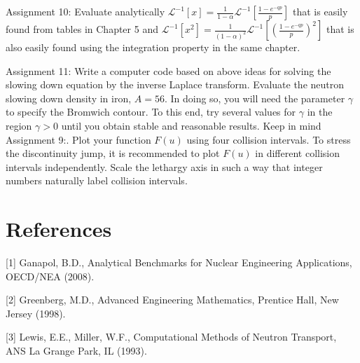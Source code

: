 \documentclass[10pt]{article}
\begin{document}
Assignment 10: Evaluate analytically $\mathcal{L}^{-1}[x]=\frac{1}{1-\alpha} \mathcal{L}^{-1}\left[\frac{1-e^{-q p}}{p}\right]$ that is easily found from tables in Chapter 5 and $\mathcal{L}^{-1}\left[x^{2}\right]=\frac{1}{(1-\alpha)^{2}} \mathcal{L}^{-1}\left[\left(\frac{1-e^{-q p}}{p}\right)^{2}\right]$ that is also easily found using the integration property in the same chapter.

Assignment 11: Write a computer code based on above ideas for solving the slowing down equation by the inverse Laplace transform. Evaluate the neutron slowing down density in iron, $A=56$. In doing so, you will need the parameter $\gamma$ to specify the Bromwich contour. To this end, try several values for $\gamma$ in the region $\gamma>0$ until you obtain stable and reasonable results. Keep in mind Assignment 9:. Plot your function $F(u)$ using four collision intervals. To stress the discontinuity jump, it is recommended to plot $F(u)$ in different collision intervals independently. Scale the lethargy axis in such a way that integer numbers naturally label collision intervals.

\section{References}
[1] Ganapol, B.D., Analytical Benchmarks for Nuclear Engineering Applications, OECD/NEA (2008).

[2] Greenberg, M.D., Advanced Engineering Mathematics, Prentice Hall, New Jersey (1998).

[3] Lewis, E.E., Miller, W.F., Computational Methods of Neutron Transport, ANS La Grange Park, IL (1993).
\end{document}
